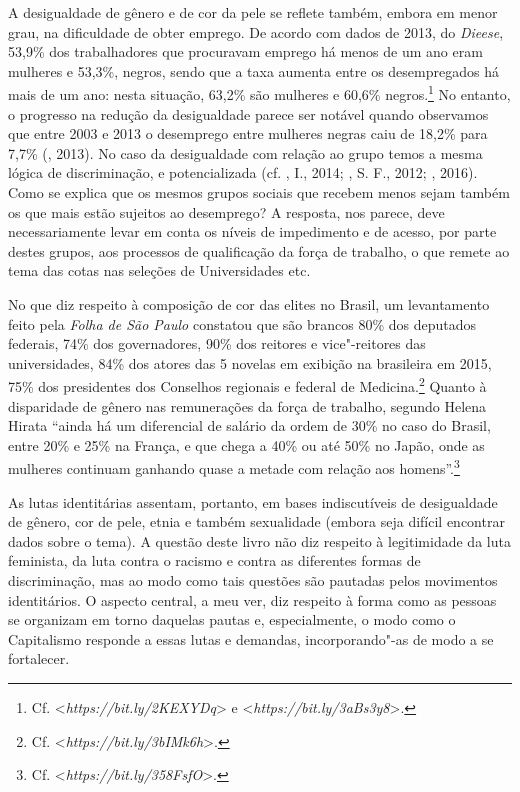 A desigualdade de gênero e de cor da pele se reflete também, embora em
menor grau, na dificuldade de obter emprego. De acordo com dados de
2013, do \emph{Dieese}, 53,9\% dos trabalhadores que procuravam emprego
há menos de um ano eram mulheres e 53,3\%, negros, sendo que a taxa
aumenta entre os desempregados há mais de um ano: nesta situação, 63,2\%
são mulheres e 60,6\% negros.\footnote{Cf.
  \textless{}\emph{https://bit.ly/2KEXYDq}\textgreater{}
  e
  \textless{}\emph{https://bit.ly/3aBs3y8}\textgreater{}.}
No entanto, o progresso na redução da desigualdade parece ser notável
quando observamos que entre 2003 e 2013 o desemprego entre mulheres
negras caiu de 18,2\% para 7,7\% (, 2013). No caso da desigualdade
com relação ao grupo  temos a mesma lógica de discriminação, e
potencializada (cf. , I., 2014; , S. F., 2012; , 2016). Como se explica que os mesmos grupos sociais que
recebem menos sejam também os que mais estão sujeitos ao desemprego? A
resposta, nos parece, deve necessariamente levar em conta os níveis de
impedimento e de acesso, por parte destes grupos, aos processos de
qualificação da força de trabalho, o que remete ao tema das cotas nas
seleções de Universidades etc.

No que diz respeito à composição de cor das elites no Brasil, um
levantamento feito pela \emph{Folha de São Paulo} constatou que são
brancos 80\% dos deputados federais, 74\% dos governadores, 90\% dos
reitores e vice"-reitores das universidades, 84\% dos atores das 5
novelas em exibição na  brasileira em 2015, 75\% dos presidentes dos
Conselhos regionais e federal de Medicina.\footnote{Cf.
  \textless{}\emph{https://bit.ly/3bIMk6h}\textgreater{}.}
Quanto à disparidade de gênero nas remunerações da força de trabalho,
segundo Helena Hirata ``ainda há um diferencial de salário da ordem de
30\% no caso do Brasil, entre 20\% e 25\% na França, e que chega a 40\%
ou até 50\% no Japão, onde as mulheres continuam ganhando quase a metade
com relação aos homens''.\footnote{Cf.
  \textless{}\emph{https://bit.ly/358FsfO}\textgreater{}.}

As lutas identitárias assentam, portanto, em bases indiscutíveis de
desigualdade de gênero, cor de pele, etnia e também sexualidade (embora
seja difícil encontrar dados sobre o tema). A questão deste livro não
diz respeito à legitimidade da luta feminista, da luta contra o racismo
e contra as diferentes formas de discriminação, mas ao modo como tais
questões são pautadas pelos movimentos identitários. O aspecto central,
a meu ver, diz respeito à forma como as pessoas se organizam em torno
daquelas pautas e, especialmente, o modo como o Capitalismo responde a
essas lutas e demandas, incorporando"-as de modo a se fortalecer.

